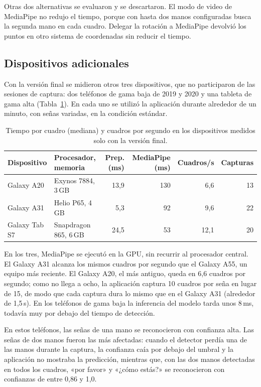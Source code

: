 Otras dos alternativas se evaluaron y se descartaron. El modo de video de MediaPipe no redujo el tiempo, porque con hasta dos manos configuradas busca la segunda mano en cada cuadro. Delegar la rotación a MediaPipe devolvió los puntos en otro sistema de coordenadas sin reducir el tiempo.

\subsection{Dispositivos adicionales}

Con la versión final se midieron otros tres dispositivos, que no participaron de las sesiones de captura: dos teléfonos de gama baja de 2019 y 2020 y una tableta de gama alta (Tabla~\ref{tab:rendimiento-extra}). En cada uno se utilizó la aplicación durante alrededor de un minuto, con señas variadas, en la condición estándar.

\begin{table}[h]
    \centering
    \small
    \setlength{\tabcolsep}{4pt}
    \begin{tabular}{llrrrr}
        \toprule
        Dispositivo & Procesador, memoria & Prep. (ms) & MediaPipe (ms) & Cuadros/s & Capturas \\
        \midrule
        Galaxy A20 & Exynos 7884, 3\,GB & 13,9 & 130 & 6,6 & 13 \\
        Galaxy A31 & Helio P65, 4\,GB & 5,3 & 92 & 9,6 & 22 \\
        Galaxy Tab S7 & Snapdragon 865, 6\,GB & 24,5 & 53 & 12,1 & 20 \\
        \bottomrule
    \end{tabular}
    \caption{Tiempo por cuadro (mediana) y cuadros por segundo en los dispositivos medidos solo con la versión final.}
    \label{tab:rendimiento-extra}
\end{table}

En los tres, MediaPipe se ejecutó en la GPU, sin recurrir al procesador central. El Galaxy A31 alcanza los mismos cuadros por segundo que el Galaxy A55, un equipo más reciente. El Galaxy A20, el más antiguo, queda en 6,6 cuadros por segundo; como no llega a ocho, la aplicación captura 10 cuadros por seña en lugar de 15, de modo que cada captura dura lo mismo que en el Galaxy A31 (alrededor de 1,5\,s). En los teléfonos de gama baja la inferencia del modelo tarda unos 8\,ms, todavía muy por debajo del tiempo de detección.

En estos teléfonos, las señas de una mano se reconocieron con confianza alta. Las señas de dos manos fueron las más afectadas: cuando el detector perdía una de las manos durante la captura, la confianza caía por debajo del umbral y la aplicación no mostraba la predicción, mientras que, con las dos manos detectadas en todos los cuadros, «por favor» y «¿cómo estás?» se reconocieron con confianzas de entre 0,86 y 1,0.

